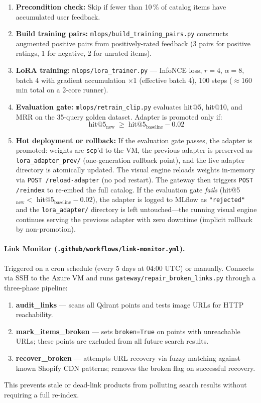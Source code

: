 \documentclass[12pt]{article}
\begin{document}
\begin{enumerate}[leftmargin=*]
    \item \textbf{Precondition check:} Skip if fewer than 10\,\% of catalog items have accumulated user feedback.
    \item \textbf{Build training pairs:} \texttt{mlops/build\_training\_pairs.py} constructs augmented positive pairs from positively-rated feedback (3 pairs for positive ratings, 1 for negative, 2 for unrated items).
    \item \textbf{LoRA training:} \texttt{mlops/lora\_trainer.py} --- InfoNCE loss, $r=4$, $\alpha=8$, batch 4 with gradient accumulation $\times$1 (effective batch 4), 100 steps ($\approx$160\,min total on a 2-core runner).
    \item \textbf{Evaluation gate:} \texttt{mlops/retrain\_clip.py} evaluates hit@5, hit@10, and MRR on the 35-query golden dataset. Adapter is promoted only if:
    \[
      \text{hit@5}_{\text{new}} \;\ge\; \text{hit@5}_{\text{baseline}} - 0.02
    \]
    \item \textbf{Hot deployment or rollback:} If the evaluation gate passes, the adapter is promoted: weights are \texttt{scp}'d to the VM, the previous adapter is preserved as \texttt{lora\_adapter\_prev/} (one-generation rollback point), and the live adapter directory is atomically updated. The visual engine reloads weights in-memory via \texttt{POST /reload-adapter} (no pod restart). The gateway then triggers \texttt{POST /reindex} to re-embed the full catalog. If the evaluation gate \emph{fails} (hit@5$_{\text{new}} < $ hit@5$_{\text{baseline}} - 0.02$), the adapter is logged to MLflow as \texttt{"rejected"} and the \texttt{lora\_adapter/} directory is left untouched---the running visual engine continues serving the previous adapter with zero downtime (implicit rollback by non-promotion).
\end{enumerate}

\paragraph{Link Monitor (\texttt{.github/workflows/link-monitor.yml}).}
Triggered on a cron schedule (every 5 days at 04:00 UTC) or manually. Connects via SSH to the Azure VM and runs \texttt{gateway/repair\_broken\_links.py} through a three-phase pipeline:
\begin{enumerate}[leftmargin=*]
    \item \textbf{audit\_links} --- scans all Qdrant points and tests image URLs for HTTP reachability.
    \item \textbf{mark\_items\_broken} --- sets \texttt{broken=True} on points with unreachable URLs; these points are excluded from all future search results.
    \item \textbf{recover\_broken} --- attempts URL recovery via fuzzy matching against known Shopify CDN patterns; removes the broken flag on successful recovery.
\end{enumerate}
This prevents stale or dead-link products from polluting search results without requiring a full re-index.
\end{document}
